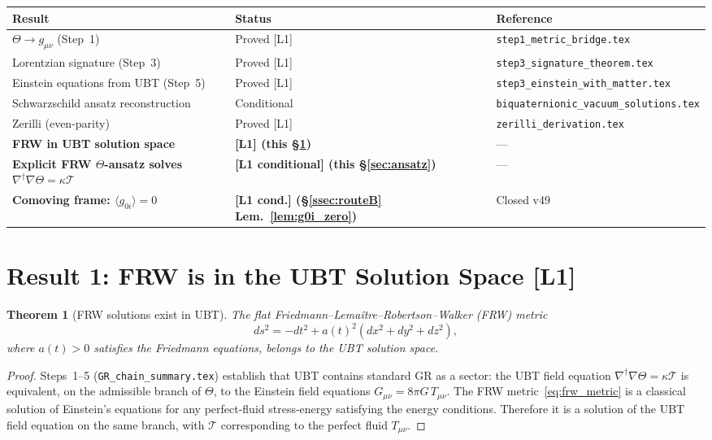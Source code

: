 \documentclass[12pt,a4paper]{article}
\newtheorem{theorem}{Theorem}[section]
\theoremstyle{definition}
\theoremstyle{remark}
\begin{document}
\begin{center}
\begin{tabular}{lll}
  \toprule
  \textbf{Result} & \textbf{Status} & \textbf{Reference} \\
  \midrule
  $\Theta \to g_{\mu\nu}$ (Step~1) & Proved [L1] &
    \texttt{step1\_metric\_bridge.tex} \\
  Lorentzian signature (Step~3) & Proved [L1] &
    \texttt{step3\_signature\_theorem.tex} \\
  Einstein equations from UBT (Step~5) & Proved [L1] &
    \texttt{step3\_einstein\_with\_matter.tex} \\
  Schwarzschild ansatz reconstruction & Conditional &
    \texttt{biquaternionic\_vacuum\_solutions.tex} \\
  Zerilli (even-parity) & Proved [L1] &
    \texttt{zerilli\_derivation.tex} \\
  \textbf{FRW in UBT solution space} & \textbf{[L1] (this §\ref{sec:frw_in_ubt})} & --- \\
  \textbf{Explicit FRW $\Theta$-ansatz solves $\nabla^\dagger\nabla\Theta=\kappa\mathcal{T}$} & \textbf{[L1 conditional] (this §\ref{sec:ansatz})} & --- \\
  \textbf{Comoving frame: $\langle g_{0i}\rangle=0$} & \textbf{[L1 cond.] (§\ref{ssec:routeB} Lem.~\ref{lem:g0i_zero})} & Closed v49 \\
  \bottomrule
\end{tabular}
\end{center}

\section{Result 1: FRW is in the UBT Solution Space [L1]}
\label{sec:frw_in_ubt}

\begin{theorem}[FRW solutions exist in UBT]
\label{thm:frw_exists}
The flat Friedmann--Lemaître--Robertson--Walker (FRW) metric
\begin{equation}
  \label{eq:frw_metric}
  ds^2 = -dt^2 + a(t)^2\!\left(dx^2+dy^2+dz^2\right),
\end{equation}
where $a(t)>0$ satisfies the Friedmann equations, belongs to the UBT solution space.
\end{theorem}

\begin{proof}
Steps~1--5 (\texttt{GR\_chain\_summary.tex}) establish that UBT contains standard GR
as a sector: the UBT field equation $\nabla^\dagger\nabla\Theta = \kappa\mathcal{T}$
is equivalent, on the admissible branch of $\Theta$, to the Einstein field equations
$G_{\mu\nu} = 8\pi G\, T_{\mu\nu}$.
The FRW metric~\eqref{eq:frw_metric} is a classical solution of Einstein's equations
for any perfect-fluid stress-energy satisfying the energy conditions.
Therefore it is a solution of the UBT field equation on the same branch, with
$\mathcal{T}$ corresponding to the perfect fluid $T_{\mu\nu}$.
\end{proof}
\end{document}
